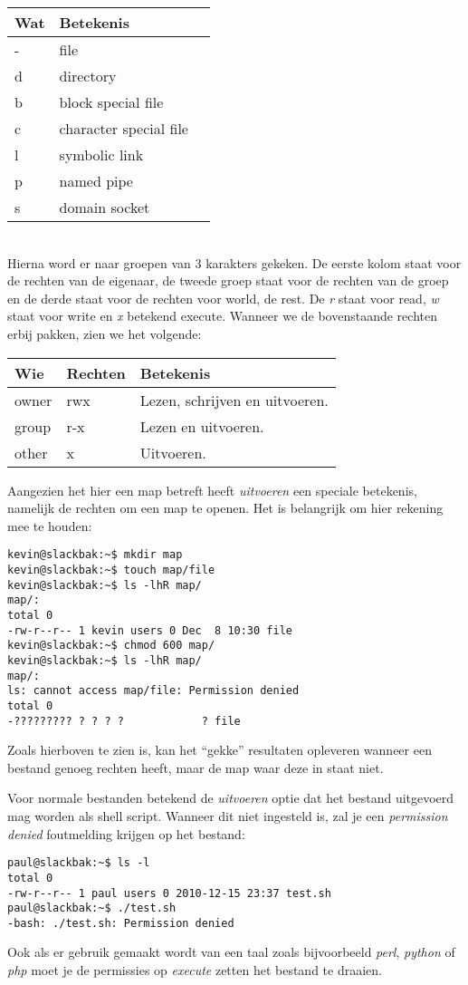 \begin{tabular}[t]{lll}
  \hline
  Wat & Betekenis\\
  \hline
  - & file\\
  d & directory\\
  b & block special file\\
  c & character special file\\
  l & symbolic link\\
  p & named pipe\\
  s & domain socket\\
\end{tabular}\\
Hierna word er naar groepen van 3 karakters gekeken. De eerste kolom staat voor de rechten van de eigenaar, de tweede groep staat voor de rechten van de groep en de derde staat voor de rechten voor world, de rest. De \emph{r} staat voor read, \emph{w} staat voor write en \emph{x} betekend execute. 
Wanneer we de bovenstaande rechten erbij pakken, zien we het volgende:

\begin{tabular}[t]{lll}
  \hline
  Wie & Rechten & Betekenis\\
  \hline
  owner & rwx & Lezen, schrijven en uitvoeren.\\
  group & r-x & Lezen en uitvoeren.\\
  other & \-\-x & Uitvoeren.\\
\end{tabular}

Aangezien het hier een map betreft heeft \emph{uitvoeren} een speciale betekenis, namelijk de rechten om een map te openen. Het is belangrijk om hier rekening mee te houden:
\begin{lstlisting}
kevin@slackbak:~$ mkdir map
kevin@slackbak:~$ touch map/file
kevin@slackbak:~$ ls -lhR map/
map/:
total 0
-rw-r--r-- 1 kevin users 0 Dec  8 10:30 file
kevin@slackbak:~$ chmod 600 map/
kevin@slackbak:~$ ls -lhR map/
map/:
ls: cannot access map/file: Permission denied
total 0
-????????? ? ? ? ?            ? file
\end{lstlisting}%
Zoals hierboven te zien is, kan het ``gekke'' resultaten opleveren wanneer een bestand genoeg rechten heeft, maar de map waar deze in staat niet. 

Voor normale bestanden betekend de \emph{uitvoeren} optie dat het bestand uitgevoerd mag worden als shell script. Wanneer dit niet ingesteld is, zal je een \emph{permission denied} foutmelding krijgen op het bestand: 
\begin{lstlisting}
paul@slackbak:~$ ls -l
total 0
-rw-r--r-- 1 paul users 0 2010-12-15 23:37 test.sh
paul@slackbak:~$ ./test.sh
-bash: ./test.sh: Permission denied
\end{lstlisting} 
Ook als er gebruik gemaakt wordt van een taal zoals bijvoorbeeld \emph{perl}, \emph{python} of \emph{php} moet je de permissies op \emph{execute} zetten het bestand te draaien.

